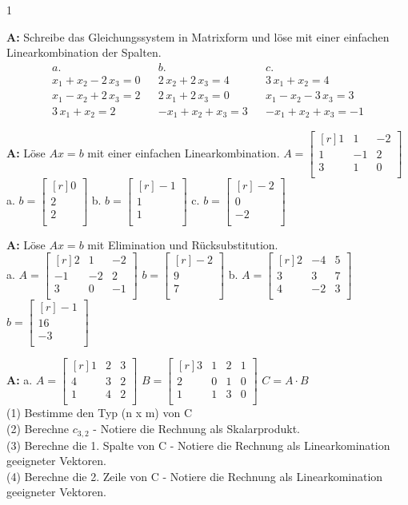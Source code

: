 \documentclass[landscape,twocolumn,a4paper]{article}
\newcommand{\matrixdd}[9]{\ensuremath{\begin{bmatrix*}[r] #1 & #2 & #3 \\  #4 & #5 & #6\\ #7 & #8 & #9 \\ \end{bmatrix*}}}
\newcommand{\vectord}[3]{\ensuremath{\begin{bmatrix*}[r] #1 \\#2 \\#3 \\ \end{bmatrix*}}}
\begin{document}
\setcounter {y} {1}
\parindent 0mm
\bigskip


  
\textbf{A:}   
Schreibe das Gleichungssystem in Matrixform und löse mit einer einfachen Linearkombination der Spalten.
 \begin{align*} 
a.  &  &  b. & & c. \\
 x_{1} + x_{2} - 2 \, x_{3} = 0 & &  2 \, x_{2} + 2 \, x_{3} = 4   & &   3 \, x_{1} + x_{2} = 4   \\
 x_{1} - x_{2} + 2 \, x_{3} = 2  & & 2 \, x_{1} + 2 \, x_{3} = 0  & & x_{1} - x_{2} - 3 \, x_{3} = 3   \\
 3 \, x_{1} + x_{2} = 2 & & -x_{1} + x_{2} + x_{3} = 3  & & -x_{1} + x_{2} + x_{3} = -1 
 \end{align*} 
 

 
\bigskip {}
 
\textbf{A:}   
Löse $Ax = b$ mit einer einfachen Linearkombination.
$A =\matrixdd{1}{1}{-2}{1}{-1}{2}{3}{1}{0}$\\

a.  $b = \vectord{0}{2}{2}$ \quad b. $b = \vectord{-1}{1}{1}$ \quad c. $ b = \vectord{-2}{0}{-2}$ 
\bigskip {}

\textbf{A:}   
Löse $Ax = b$ mit Elimination und Rücksubstitution. \\

a.  $A =\matrixdd{2}{1}{-2}{-1}{-2}{2}{3}{0}{-1}$ \quad $b = \vectord{-2}{9}{7}$  \quad
b.  $A =\matrixdd{2}{-4}{5}{3}{3}{7}{4}{-2}{3}$ \quad $b = \vectord{-1}{16}{-3}$ 
\bigskip {}

\textbf{A:}   
a.
$A =\matrixdd{1}{2}{3}{4}{3}{2}{1}{4}{2}$  \quad
 $B =\begin{bmatrix*}[r] 3 & 1 & 2 & 1\\  2 & 0 & 1 & 0\\ 1 & 1 & 3 & 0\\ \end{bmatrix*}$  \quad
 $C = A \cdot B$  \\ 
 (1) Bestimme den Typ (n x m) von C \\
 (2) Berechne $c_{3,2}$ - Notiere die Rechnung als Skalarprodukt.\\
 (3) Berechne die 1. Spalte von C  - Notiere die Rechnung als Linearkomination geeigneter Vektoren. \\
 (4) Berechne die 2. Zeile von C  - Notiere die Rechnung als Linearkomination geeigneter Vektoren. 
\end{document}
